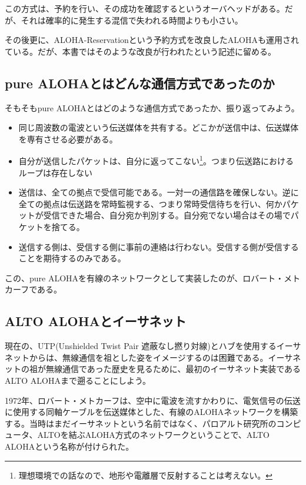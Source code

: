 この方式は、予約を行い、その成功を確認するというオーバヘッドがある。だが、それは確率的に発生する混信で失われる時間よりも小さい。

その後更に、ALOHA-Reservationという予約方式を改良したALOHAも運用されている。だが、本書ではそのような改良が行われたという記述に留める。

\subsection{pure ALOHAとはどんな通信方式であったのか}

そもそもpure ALOHAとはどのような通信方式であったか、振り返ってみよう。

\begin{itemize}
\item 同じ周波数の電波という伝送媒体を共有する。どこかが送信中は、伝送媒体を専有させる必要がある。
\item 自分が送信したパケットは、自分に返ってこない\footnote{理想環境での話なので、地形や電離層で反射することは考えない。}。つまり伝送路におけるループは存在しない
\item 送信は、全ての拠点で受信可能である。一対一の通信路を確保しない。逆に全ての拠点は伝送路を常時監視する、つまり常時受信待ちを行い、何かパケットが受信できた場合、自分宛か判別する。自分宛でない場合はその場でパケットを捨てる。
\item 送信する側は、受信する側に事前の連絡は行わない。受信する側が受信することを期待するのみである。
\end{itemize}

この、pure ALOHAを有線のネットワークとして実装したのが、ロバート・メトカーフである。

\subsection{ALTO ALOHAとイーサネット}

現在の、UTP(Unshielded Twist Pair 遮蔽なし撚り対線)とハブを使用するイーサネットからは、無線通信を祖とした姿をイメージするのは困難である。イーサネットの祖が無線通信であった歴史を見るために、最初のイーサネット実装であるALTO ALOHAまで遡ることにしよう。

1972年、ロバート・メトカーフは、空中に電波を流すかわりに、電気信号の伝送に使用する同軸ケーブルを伝送媒体とした、有線のALOHAネットワークを構築する。当時はまだイーサネットという名前ではなく、パロアルト研究所のコンピュータ、ALTOを結ぶALOHA方式のネットワークということで、ALTO ALOHAという名称が付けられた。

